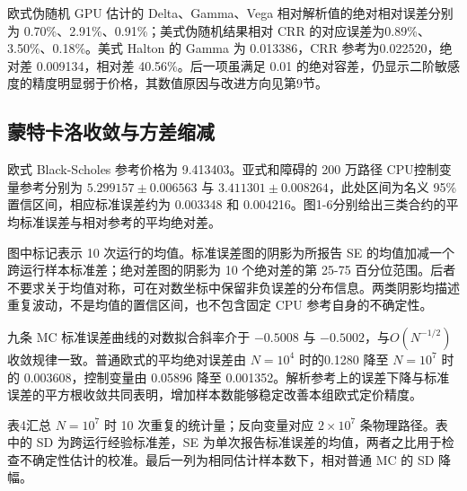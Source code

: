 \documentclass[UTF8,a4paper,zihao=5,fontset=none]{ctexart}
\begin{document}
欧式伪随机 GPU 估计的 Delta、Gamma、Vega 相对解析值的绝对相对误差分别为 0.70\%、2.91\%、0.91\%；美式伪随机结果相对 CRR 的对应误差为0.89\%、3.50\%、0.18\%。美式 Halton 的 Gamma 为 0.013386，CRR 参考为0.022520，绝对差 0.009134，相对差 40.56\%。后一项虽满足 0.01 的绝对容差，仍显示二阶敏感度的精度明显弱于价格，其数值原因与改进方向见第9节。


\subsection{蒙特卡洛收敛与方差缩减}

欧式 Black-Scholes 参考价格为 9.413403。亚式和障碍的 200 万路径 CPU控制变量参考分别为 $5.299157\pm0.006563$ 与 $3.411301\pm0.008264$，此处区间为名义 95\% 置信区间，相应标准误差约为 0.003348 和 0.004216。图1-6分别给出三类合约的平均标准误差与相对参考的平均绝对差。


图中标记表示 10 次运行的均值。标准误差图的阴影为所报告 SE 的均值加减一个跨运行样本标准差；绝对差图的阴影为 10 个绝对差的第 25-75 百分位范围。后者不要求关于均值对称，可在对数坐标中保留非负误差的分布信息。两类阴影均描述重复波动，不是均值的置信区间，也不包含固定 CPU 参考自身的不确定性。


九条 MC 标准误差曲线的对数拟合斜率介于 $-0.5008$ 与 $-0.5002$，与$O(N^{-1/2})$ 收敛规律一致。普通欧式的平均绝对误差由 $N=10^4$ 时的0.1280 降至 $N=10^7$ 时的 0.003608，控制变量由 0.05896 降至 0.001352。解析参考上的误差下降与标准误差的平方根收敛共同表明，增加样本数能够稳定改善本组欧式定价精度。


表4汇总 $N=10^7$ 时 10 次重复的统计量；反向变量对应 $2\times10^7$ 条物理路径。表中的 SD 为跨运行经验标准差，SE 为单次报告标准误差的均值，两者之比用于检查不确定性估计的校准。最后一列为相同估计样本数下，相对普通 MC 的 SD 降幅。
\end{document}
